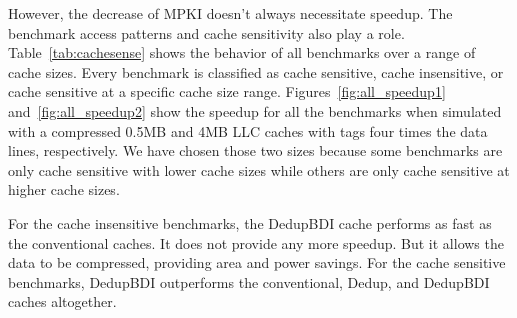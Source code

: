 However, the decrease of MPKI doesn't always necessitate speedup. The benchmark access patterns and cache sensitivity also play a role. Table~\ref{tab:cachesense} shows the behavior of all benchmarks over a range of cache sizes. Every benchmark is classified as cache sensitive, cache insensitive, or cache sensitive at a specific cache size range.
Figures~\ref{fig:all_speedup1} and~\ref{fig:all_speedup2} show the speedup for all the benchmarks when simulated with a compressed 0.5MB and 4MB LLC caches with tags four times the data lines, respectively. We have chosen those two sizes because some benchmarks are only cache sensitive with lower cache sizes while others are only cache sensitive at higher cache sizes.\par
For the cache insensitive benchmarks, the DedupBDI cache performs as fast as the conventional caches. It does not provide any more speedup. But it allows the data to be compressed, providing area and power savings. For the cache sensitive benchmarks, DedupBDI outperforms the conventional, Dedup, and DedupBDI caches altogether.

